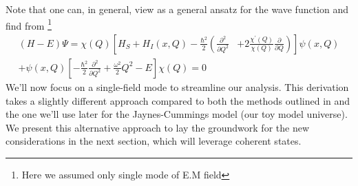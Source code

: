 Note that one can, in general, view  as a general ansatz for the wave function
and find from \footnote{Here we assumed only single mode of E.M field} 
\begin{align}
    \label{eq:class_jcm_eqA}
    (H - E) \Psi = \chi(Q)\left[H_S+H_I(x, Q)-\frac{\hbar^2}{2}\left(\frac{\partial^2}{\partial Q^2}\right.\right.
    & \left.\left. 
    +2 \frac{\chi^{\prime}(Q)}{\chi(Q)} \frac{\partial}{\partial Q}\right)\right] 
    \psi(x, Q) \nonumber \\
    +\psi(x, Q)\left[-\frac{\hbar^2}{2} \frac{\partial^2}{\partial Q^2}+\frac{\omega^2}{2} Q^2
    - E\right] \chi(Q) = 0
\end{align}
We'll now focus on a single-field mode to streamline our analysis. This derivation takes a 
slightly different approach compared to both the methods outlined in 
and the one we'll use later for the Jaynes-Cummings model (our toy model universe). 
We present this alternative approach to lay the groundwork for the new considerations 
in the next section, which will leverage coherent states.

